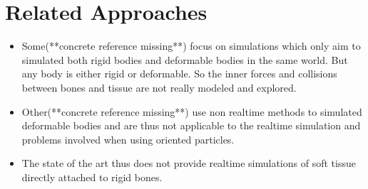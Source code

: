 \chapter{Related Approaches}
\label{cha:related_approaches}

\begin{itemize}
\item Some(**concrete reference missing**) focus on simulations which only aim to simulated both rigid bodies and deformable bodies in the same world. But  any body is either rigid or deformable. So the inner forces and collisions between bones and tissue are not really modeled and explored.

\item Other(**concrete reference missing**) use non realtime methods to simulated deformable bodies and are thus not applicable to the realtime simulation and problems involved when using oriented particles.

\item The state of the art thus does not provide realtime simulations of soft tissue directly attached to rigid bones.
\end{itemize}